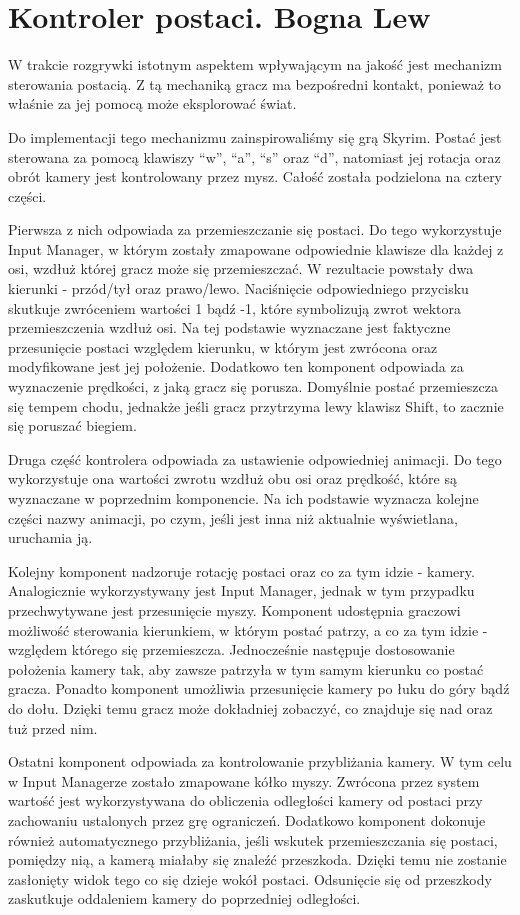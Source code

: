 \section{Kontroler postaci. Bogna Lew}

W trakcie rozgrywki istotnym aspektem wpływającym na jakość jest mechanizm sterowania postacią. Z tą mechaniką gracz ma
bezpośredni kontakt, ponieważ to właśnie za jej pomocą może eksplorować świat.

Do implementacji tego mechanizmu zainspirowaliśmy się grą Skyrim. Postać jest sterowana za pomocą klawiszy “w”, “a”, “s”
oraz “d”, natomiast jej rotacja oraz obrót kamery jest kontrolowany przez mysz. Całość została podzielona na cztery
części.

Pierwsza z nich odpowiada za przemieszczanie się postaci. Do tego wykorzystuje Input Manager, w którym zostały
zmapowane odpowiednie klawisze dla każdej z osi, wzdłuż której gracz może się przemieszczać. W rezultacie powstały dwa
kierunki - przód/tył oraz prawo/lewo. Naciśnięcie odpowiedniego przycisku skutkuje zwróceniem wartości 1 bądź -1, które
symbolizują zwrot wektora przemieszczenia wzdłuż osi. Na tej podstawie wyznaczane jest faktyczne przesunięcie postaci
względem kierunku, w którym jest zwrócona oraz modyfikowane jest jej położenie. Dodatkowo ten komponent odpowiada za
wyznaczenie prędkości, z jaką gracz się porusza. Domyślnie postać przemieszcza się tempem chodu, jednakże jeśli gracz
przytrzyma lewy klawisz Shift, to zacznie się poruszać biegiem.

Druga część kontrolera odpowiada za ustawienie odpowiedniej animacji. Do tego wykorzystuje ona wartości zwrotu wzdłuż
obu osi oraz prędkość, które są wyznaczane w poprzednim komponencie. Na ich podstawie wyznacza kolejne części nazwy
animacji, po czym, jeśli jest inna niż aktualnie wyświetlana, uruchamia ją.

Kolejny komponent nadzoruje rotację postaci oraz co za tym idzie - kamery. Analogicznie wykorzystywany jest Input
Manager, jednak w tym przypadku przechwytywane jest przesunięcie myszy. Komponent udostępnia graczowi możliwość
sterowania kierunkiem, w którym postać patrzy, a co za tym idzie - względem którego się przemieszcza. Jednocześnie
następuje dostosowanie położenia kamery tak, aby zawsze patrzyła w tym samym kierunku co postać gracza. Ponadto
komponent umożliwia przesunięcie kamery po łuku do góry bądź do dołu. Dzięki temu gracz może dokładniej zobaczyć,
co znajduje się nad oraz tuż przed nim.

Ostatni komponent odpowiada za kontrolowanie przybliżania kamery. W tym celu w Input Managerze zostało zmapowane kółko
myszy. Zwrócona przez system wartość jest wykorzystywana do obliczenia odległości kamery od postaci przy zachowaniu
ustalonych przez grę ograniczeń. Dodatkowo komponent dokonuje również automatycznego przybliżania, jeśli wskutek
przemieszczania się postaci, pomiędzy nią, a kamerą miałaby się znaleźć przeszkoda. Dzięki temu nie zostanie zasłonięty
widok tego co się dzieje wokół postaci. Odsunięcie się od przeszkody zaskutkuje oddaleniem kamery do poprzedniej
odległości.
